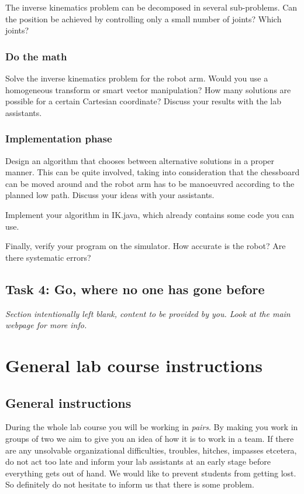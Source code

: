 \documentclass[10pt]{scrartcl}
\begin{document}
  The inverse kinematics problem can be decomposed in several
  sub-problems. Can the position be achieved by controlling only a small
  number of joints? Which joints? 

\subsubsection{Do the math}
  Solve the inverse kinematics problem for the robot arm. Would you use
  a homogeneous transform or smart vector manipulation? How many
  solutions are possible for a certain Cartesian coordinate? Discuss
  your results with the lab assistants.
  
\subsubsection{Implementation phase}
  Design an algorithm that chooses between alternative solutions in a
  proper manner. This can be quite involved, taking into consideration
  that the chessboard can be moved around and the robot arm has to be
  manoeuvred according to the planned low path. Discuss your ideas
  with your assistants. 
  
  Implement your algorithm in {\ttfamily\small IK.java}, which already
  contains some code you can use.

  Finally, verify your program on the simulator. How accurate is the
  robot? Are there systematic errors?

\subsection{Task 4: Go, where no one has gone before}
\label{sec:Task4}

{\it Section intentionally left blank, content to be provided by you. Look
at the main webpage for more info.}

\section{General lab course instructions}
\label{sec:Report}
\subsection{General instructions}
During the whole lab course you will be working in {\em pairs}.
By making you work in groups of two we aim to give you an idea of how it
is to work in a team. If there are any unsolvable organizational
difficulties, troubles, hitches, impasses etcetera, do not act too late
and inform your lab assistants at an early stage before everything gets
out of hand. We would like to prevent students from getting lost. So
definitely do not hesitate to inform us that there is some problem.
\end{document}
